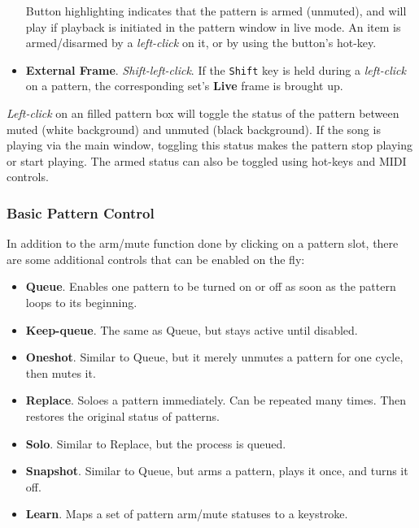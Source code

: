 \begin{itemize}
         Button highlighting indicates that the pattern is armed
         (unmuted), and will play if playback is initiated in the pattern
         window in live mode.
         An item is armed/disarmed by a
         \textsl{left-click} on it, or by using the
         button's hot-key.
      \item \textbf{External Frame}. \textsl{Shift-left-click}.
         If the \texttt{Shift} key is held during a
         \textsl{left-click} on a pattern,
         the corresponding set's \textbf{Live} frame is brought up.
   \end{itemize}

   \textsl{Left-click} on an filled pattern box will toggle the status of the
   pattern between muted (white background) and unmuted (black background).
   If the song is playing via the main window, toggling this status makes
   the pattern stop playing or start playing.  The armed status
   can also be toggled using hot-keys and MIDI controls.

\subsubsection{Basic Pattern Control}
\label{subsubsec:patterns_basic_pattern_control}

   In addition to the arm/mute function done by clicking on a pattern slot,
   there are some additional controls that can be enabled on the fly:

   \begin{itemize}
      \item \textbf{Queue}.
         Enables one pattern to be turned on or off as soon as the pattern
         loops to its beginning.
      \item \textbf{Keep-queue}.
         The same as Queue, but stays active until disabled.
      \item \textbf{Oneshot}.
         Similar to Queue, but it merely unmutes a pattern for one cycle,
         then mutes it.
      \item \textbf{Replace}.
         Soloes a pattern immediately.
         Can be repeated many times.
         Then restores the original status of patterns.
      \item \textbf{Solo}.
         Similar to Replace, but the process is queued.
      \item \textbf{Snapshot}.
         Similar to Queue, but arms a pattern, plays it once, and turns it
         off.
      \item \textbf{Learn}.
         Maps a set of pattern arm/mute statuses to a keystroke.
   \end{itemize}

